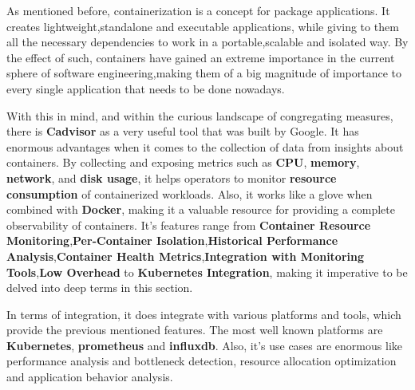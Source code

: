 As mentioned before, containerization is a concept for package applications. It creates lightweight,standalone  and executable applications, while giving to them all the necessary dependencies to work in a portable,scalable and isolated way. By the effect of such, containers have gained an extreme importance in the current sphere of software engineering,making them of a big magnitude of importance to every single application that needs to be done nowadays.

With this in mind, and within the curious landscape of congregating measures, there is \textbf{Cadvisor} as a very useful tool that was built by Google. It has enormous advantages when it comes to the collection of data from insights about containers. By collecting and exposing metrics such as \textbf{CPU}, \textbf{memory}, \textbf{network}, and \textbf{disk usage}, it helps operators to monitor \textbf{resource consumption} of containerized workloads. Also, it works like a glove when combined with \textbf{Docker}, making it a valuable resource for providing a complete observability of containers. It's features range from \textbf{Container Resource Monitoring},\textbf{Per-Container Isolation},\textbf{Historical Performance Analysis},\textbf{Container Health Metrics},\textbf{Integration with Monitoring Tools},\textbf{Low Overhead} to \textbf{Kubernetes Integration}, making it imperative to be delved into deep terms in this section.

In terms of integration, it does integrate with various platforms and tools, which provide the previous mentioned features. The most well known platforms are \textbf{Kubernetes}, \textbf{prometheus} and \textbf{influxdb}. Also, it's use cases are enormous like performance analysis and bottleneck detection, resource allocation optimization and application behavior analysis.


